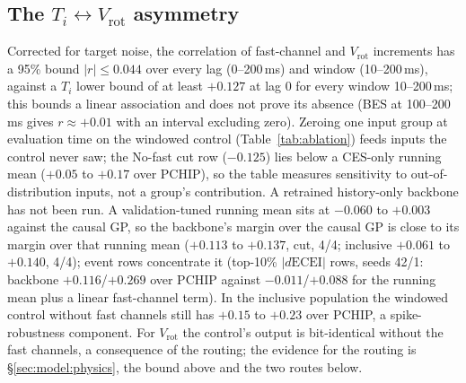 \documentclass[10pt,twocolumn,letterpaper]{article}
\newcommand{\Ti}{\ensuremath{T_i}}
\newcommand{\Vrot}{\ensuremath{V_\mathrm{rot}}}
\newcommand{\skillp}{\ensuremath{\mathrm{skill}_{\mathrm{PCHIP}}}}
\begin{document}
\subsection{\texorpdfstring{The \Ti$\leftrightarrow$\Vrot{} asymmetry}{The Ti-Vrot asymmetry}}
\label{sec:res:asym}
Corrected for target noise, the correlation of fast-channel and \Vrot{} increments has
a 95\% bound $|r| \leq 0.044$ over every lag (0--200\,ms) and window (10--200\,ms),
against a \Ti{} lower bound of at least $+0.127$ at lag 0 for every window 10--200\,ms; this
bounds a linear association and does not prove its absence (BES at 100--200\,ms gives
$r \approx +0.01$ with an interval excluding zero). Zeroing one input group at
evaluation time on the windowed control (Table~\ref{tab:ablation}) feeds inputs the
control never saw; the No-fast cut row ($-0.125$) lies below a CES-only running mean
($+0.05$ to $+0.17$ over PCHIP), so the table measures sensitivity to
out-of-distribution inputs, not a group's contribution. A retrained history-only
backbone has not been run. A validation-tuned running mean sits at $-0.060$ to $+0.003$
against the causal GP, so the backbone's margin over the causal GP is close to its
margin over that running mean ($+0.113$ to $+0.137$, cut, 4/4; inclusive $+0.061$ to
$+0.140$, 4/4); event rows concentrate it (top-10\% $|d\mathrm{ECEI}|$ rows, seeds
42/1: backbone $+0.116$/$+0.269$ over PCHIP against $-0.011$/$+0.088$ for the running
mean plus a linear fast-channel term). In the inclusive population the windowed
control without fast channels still has $+0.15$ to $+0.23$ over PCHIP, a
spike-robustness component. For \Vrot{} the control's output is bit-identical without
the fast channels, a consequence of the routing; the evidence for the routing is
\S\ref{sec:model:physics}, the bound above and the two routes below.

\begin{table}[t]
  \centering
  \caption{Evaluation-time input sensitivity of the windowed control (no retraining):
  $\skillp$ for \Ti{} (4-split mean) and the paired change against the full model
  ($^{*}$ = significant splits). Zeroed inputs are out of distribution for the control,
  so the rows measure sensitivity, not a group's contribution.}
  \label{tab:ablation}
  \footnotesize
  \setlength{\tabcolsep}{2.5pt}
\end{table}
\end{document}
